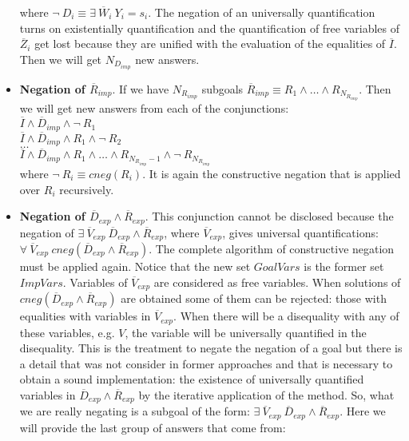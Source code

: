 \documentclass{llncs}
\begin{document}
\begin{itemize}
           where $ \neg~ D_i \equiv \exists~
           \overline{W}_i~ Y_i = s_i$. The negation of an universally
           quantification turns on existentially quantification and
           the quantification of free variables of $\overline{Z}_i$
           get lost because they are unified with the evaluation of
           the equalities of $\overline{I}$. Then we will get
           $N_{D_{imp}}$ new answers.


           \item {\bf Negation of $\overline{R}_{imp}$}. If we have
           $N_{R_{imp}}$ subgoals $\overline{R}_{imp} \equiv R_1
           \wedge \ldots \wedge R_{N_{R_{imp}}}$. Then we will get
           new answers from each of the conjunctions: \\

           $\overline{I} \wedge \overline{D}_{imp} \wedge \neg~ R_1 $ \\ 
           $\overline{I} \wedge \overline{D}_{imp} \wedge
           R_1 \wedge \neg~ R_2 $ \\ 
           $\ldots $ \\ 
           $\overline{I} \wedge \overline{D}_{imp} \wedge
           R_1 \wedge \ldots \wedge R_{N_{R_{imp}}-1} \wedge \neg~
           R_{N_{R_{imp}}}$ \\ 

           where $ \neg~ R_i \equiv cneg(R_i)$. It is again the
           constructive negation that is applied over $R_i$
           recursively.


           \item {\bf Negation of $\overline{D}_{exp} \wedge
           \overline{R}_{exp}$}. This conjunction cannot be disclosed
           because the negation of $ \exists~ \overline{V}_{exp}~
           \overline{D}_{exp} \wedge \overline{R}_{exp}$, where
           $\overline{V}_{exp}$, gives universal quantifications:
           $\forall~ \overline{V}_{exp}~ cneg(\overline{D}_{exp}
           \wedge \overline{R}_{exp})$. The complete algorithm of
           constructive negation must be applied again. Notice that
           the new set $GoalVars$ is the former set
           $ImpVars$. Variables of $\overline{V}_{exp}$ are considered
           as free variables. When solutions of
           $cneg(\overline{D}_{exp} \wedge \overline{R}_{exp})$ are
           obtained some of them can be rejected: those with
           equalities with variables in $\overline{V}_{exp}$. When
           there will be a disequality with any of these variables,
           e.g. $V$, the variable will be universally quantified in
           the disequality.  This is the treatment to negate the
           negation of a goal but there is a detail that was not
           consider in former approaches and that is necessary to
           obtain a sound implementation: the existence of universally
           quantified variables in $\overline{D}_{exp} \wedge
           \overline{R}_{exp}$ by the iterative application of the
           method.  So, what we are really negating is a subgoal of
           the form: $ \exists~ \overline{V}_{exp}~ \overline{D}_{exp}
           \wedge \overline{R}_{exp}$.  Here we will provide the last
           group of answers that come from:


\end{itemize}
\end{document}
